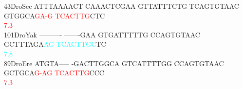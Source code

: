 \documentclass[11pt,twoside,reqno,a4paper]{article}
\begin{document}
{43\hspace*{2\charwidth}DroSec	ATTTAAAACT	CAAACTCGAA	GTTATTTCTG	TCAGTGTAAC	GTGGCA\textcolor{red}{G}\textcolor{red}{A}\textcolor{red}{-}\textcolor{red}{G}	\textcolor{red}{T}\textcolor{red}{C}\textcolor{red}{A}\textcolor{red}{C}\textcolor{red}{T}\textcolor{red}{T}\textcolor{red}{G}CTC	\\
\hspace*{4\charwidth}\hspace*{7\charwidth}\hspace*{1\charwidth}\hspace*{1\charwidth}\hspace*{1\charwidth}\hspace*{1\charwidth}\hspace*{46\charwidth}\textcolor{red}{7.3}\hspace*{1\charwidth}\hspace*{1\charwidth}\\
101\hspace*{1\charwidth}DroYak	----------	-------GAA	GTGATTTTTG	CCAGTGTAAC	GCTTTAGA\textcolor{cyan}{A}\textcolor{cyan}{G}	\textcolor{cyan}{T}\textcolor{cyan}{C}\textcolor{cyan}{A}\textcolor{cyan}{C}\textcolor{cyan}{T}\textcolor{cyan}{T}\textcolor{cyan}{G}\textcolor{cyan}{C}TC	\\
\hspace*{4\charwidth}\hspace*{7\charwidth}\hspace*{1\charwidth}\hspace*{1\charwidth}\hspace*{1\charwidth}\hspace*{1\charwidth}\hspace*{48\charwidth}\textcolor{cyan}{7.8}\hspace*{1\charwidth}\hspace*{1\charwidth}\\
89\hspace*{2\charwidth}DroEre	ATGTA-----	-GACTTGGCA	GTCATTTTGG	CCAGTGTAAC	GCTGCA\textcolor{red}{G}\textcolor{red}{-}\textcolor{red}{A}\textcolor{red}{G}	\textcolor{red}{T}\textcolor{red}{C}\textcolor{red}{A}\textcolor{red}{C}\textcolor{red}{T}\textcolor{red}{T}\textcolor{red}{G}CCC	\\
\hspace*{4\charwidth}\hspace*{7\charwidth}\hspace*{1\charwidth}\hspace*{1\charwidth}\hspace*{1\charwidth}\hspace*{1\charwidth}\hspace*{46\charwidth}\textcolor{red}{7.3}\hspace*{1\charwidth}\hspace*{1\charwidth}\\
}
\end{document}

